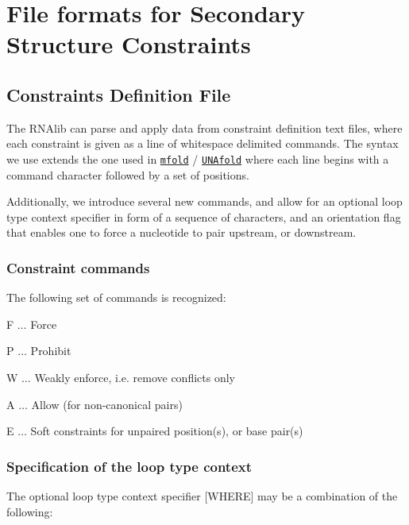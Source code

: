 \hypertarget{file_formats_constraint-formats}{}\section{File formats for Secondary Structure Constraints}\label{file_formats_constraint-formats}
\hypertarget{file_formats_constraint-formats-file}{}\subsection{Constraints Definition File}\label{file_formats_constraint-formats-file}
The R\-N\-Alib can parse and apply data from constraint definition text files, where each constraint is given as a line of whitespace delimited commands. The syntax we use extends the one used in \href{http://mfold.rna.albany.edu/?q=mfold}{\tt mfold} / \href{http://mfold.rna.albany.edu/?q=DINAMelt/software}{\tt U\-N\-Afold} where each line begins with a command character followed by a set of positions.\par
Additionally, we introduce several new commands, and allow for an optional loop type context specifier in form of a sequence of characters, and an orientation flag that enables one to force a nucleotide to pair upstream, or downstream.\hypertarget{file_formats_const_file_commands}{}\subsubsection{Constraint commands}\label{file_formats_const_file_commands}
The following set of commands is recognized\-:
\begin{DoxyItemize}
\item {\ttfamily F} $ \ldots $ Force
\item {\ttfamily P} $ \ldots $ Prohibit
\item {\ttfamily W} $ \ldots $ Weakly enforce, i.\-e. remove conflicts only
\item {\ttfamily A} $ \ldots $ Allow (for non-\/canonical pairs)
\item {\ttfamily E} $ \ldots $ Soft constraints for unpaired position(s), or base pair(s)
\end{DoxyItemize}\hypertarget{file_formats_const_file_loop_types}{}\subsubsection{Specification of the loop type context}\label{file_formats_const_file_loop_types}
The optional loop type context specifier {\ttfamily }\mbox{[}W\-H\-E\-R\-E\mbox{]} may be a combination of the following\-:
